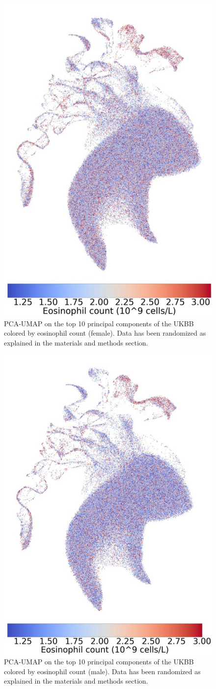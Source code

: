 \documentclass[12pt]{pnas-new}
\begin{document}
\begin{figure}
    \centering
    \includegraphics[width=0.4\columnwidth]{images/UKBB_UMAP_PC10_NN15_MD05_2018328174511_201871417720_eosinophill_count_pct5_f.pdf}
    \caption{PCA-UMAP on the top 10 principal components of the UKBB colored by eosinophil count (female). Data has been randomized as explained in the materials and methods section.}
    \label{fig:supp_ukbb_eosinophill_f}
\end{figure}

\begin{figure}
    \centering
    \includegraphics[width=0.4\columnwidth]{images/UKBB_UMAP_PC10_NN15_MD05_2018328174511_201871417720_eosinophill_count_pct5_m.pdf}
    \caption{PCA-UMAP on the top 10 principal components of the UKBB colored by eosinophil count (male). Data has been randomized as explained in the materials and methods section.}
    \label{fig:supp_ukbb_eosinophill_m}
\end{figure}
\end{document}
